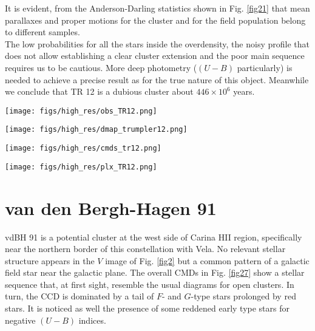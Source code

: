 \documentclass{aa}
\begin{document}
It is evident, from the Anderson-Darling statistics shown in Fig. \ref{fig21}
that mean parallaxes and proper motions for the cluster and for the field
population belong to different samples.\\

The low probabilities for all the stars inside the overdensity, the noisy
profile that does not allow establishing a clear cluster extension and the poor
main sequence requires us to be cautious. More deep photometry ($(U-B)$
particularly) is needed to achieve a precise result as for the true nature of
this object. Meanwhile we conclude that TR 12 is a dubious cluster about
$446\times10^6$ years.

\begin{figure*}[ht]
    \centering
    \texttt{[image: figs/high\_res/obs\_TR12.png]}
    \caption{Idem Fig. \ref{fig3} for TR 12.}
    \label{fig19}
\end{figure*}
\begin{figure*}[ht]
    \centering
    \texttt{[image: figs/high\_res/dmap\_trumpler12.png]}
    \caption{Idem Fig. \ref{fig4} for TR 12.}
    \label{fig20}
\end{figure*}
\begin{figure*}[ht]
    \centering
    \texttt{[image: figs/high\_res/cmds\_tr12.png]}
    \caption{Idem Fig. \ref{fig5} for TR 12.}
    \label{fig21}
\end{figure*}
\begin{figure*}[ht]
    \centering
    \texttt{[image: figs/high\_res/plx\_TR12.png]}
    \caption{Idem Fig. \ref{fig6} for TR 12.}
    \label{fig22}
\end{figure*}



\section{van den Bergh-Hagen 91}

vdBH 91 is a potential cluster at the west side of Carina HII
region, specifically near the northern border of this constellation with Vela.
No relevant stellar structure appears in the $V$ image of Fig. \ref{fig2} but a
common pattern of a galactic field star near the galactic plane. The overall
CMDs in Fig. \ref{fig27} show a stellar sequence that, at first sight, resemble
the usual diagrams for open clusters. In turn, the CCD
is dominated by a tail of $F$- and $G$-type stars prolonged by red stars. It is
noticed as well the presence of some reddened early type stars for negative
$(U-B)$ indices.\\
\end{document}
